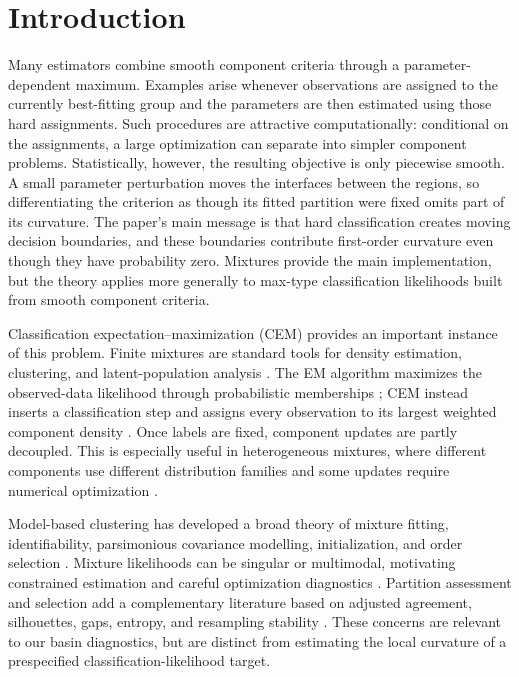 \documentclass[numsec,webpdf,modern,medium,namedate]{oup-authoring-template}
\theoremstyle{plain}
\theoremstyle{definition}
\theoremstyle{remark}
\begin{document}
\section{Introduction}
\label{sec:introduction}

Many estimators combine smooth component criteria through a parameter-dependent
maximum.  Examples arise whenever observations are assigned to the currently
best-fitting group and the parameters are then estimated using those hard
assignments.  Such procedures are attractive computationally: conditional on
the assignments, a large optimization can separate into simpler component
problems.  Statistically, however, the resulting objective is only piecewise
smooth.  A small parameter perturbation moves the interfaces between the
regions, so differentiating the criterion as though its fitted partition were
fixed omits part of its curvature.
The paper's main message is that hard classification creates moving decision
boundaries, and these boundaries contribute first-order curvature even though
they have probability zero.  Mixtures provide the main implementation, but
the theory applies more generally to max-type classification likelihoods built
from smooth component criteria.

Classification expectation--maximization (CEM) provides an important instance
of this problem.  Finite mixtures are standard tools for density estimation,
clustering, and latent-population analysis \citep{mclachlan2000finite}.  The EM
algorithm maximizes the observed-data likelihood through probabilistic
memberships \citep{dempster1977maximum}; CEM instead inserts a classification
step and assigns every observation to its largest weighted component density
\citep{celeux1992classification}.  Once labels are fixed, component updates
are partly decoupled.  This is especially useful in heterogeneous mixtures,
where different components use different distribution families and some
updates require numerical optimization \citep{pal2026flexible}.

Model-based clustering has developed a broad theory of mixture fitting,
identifiability, parsimonious covariance modelling, initialization, and order
selection \citep{titterington1985statistical,redner1984mixture,
banfield1993model,fraley2002model,keribin2000consistent}. Mixture likelihoods
can be singular or multimodal, motivating constrained estimation and careful
optimization diagnostics \citep{hathaway1985constrained,chen1995optimal,
mclachlan2008em}. Partition assessment and selection add a complementary
literature based on adjusted agreement, silhouettes, gaps, entropy, and
resampling stability \citep{hubert1985comparing,rousseeuw1987silhouettes,
tibshirani2001gap,celeux1996entropy,benhur2002stability,fang2012selection}.
These concerns are relevant to our basin diagnostics, but are distinct from
estimating the local curvature of a prespecified classification-likelihood
target.
\end{document}
